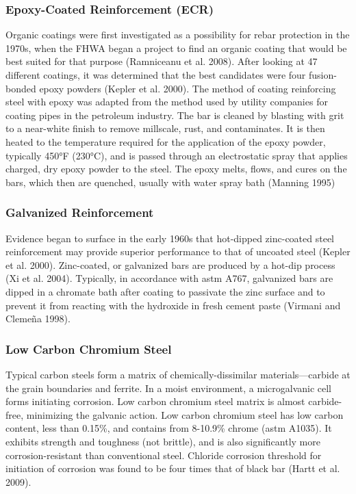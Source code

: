 \subsubsection{Epoxy-Coated Reinforcement (ECR)}

Organic coatings were first investigated as a possibility for rebar protection in the 1970s, when the FHWA began
a project to find an organic coating that would be best suited for that purpose (Ramniceanu et al. 2008). After
looking at 47 different coatings, it was determined that the best candidates were four fusion-bonded epoxy powders
(Kepler et al. 2000). The method of coating reinforcing steel with epoxy was adapted from the method used by
utility companies for coating pipes in the petroleum industry. The bar is cleaned by blasting with grit to a near-white
finish to remove millscale, rust, and contaminates. It is then heated to the temperature required for the application of
the epoxy powder, typically 450°F (230°C), and is passed through an electrostatic spray that applies charged, dry
epoxy powder to the steel. The epoxy melts, flows, and cures on the bars, which then are quenched, usually with
water spray bath (Manning 1995)


\subsubsection{Galvanized Reinforcement}
Evidence began to surface in the early 1960s that hot-dipped zinc-coated steel reinforcement may provide
superior performance to that of uncoated steel (Kepler et al. 2000). Zinc-coated, or galvanized bars are produced by
a hot-dip process (Xi et al. 2004). Typically, in accordance with \acrshort*{astm} A767, galvanized bars are dipped in a
chromate bath after coating to passivate the zinc surface and to prevent it from reacting with the hydroxide in fresh
cement paste (Virmani and Clemeña 1998).


\subsubsection{Low Carbon Chromium Steel}
Typical carbon steels form a matrix of chemically-dissimilar materials—carbide at the grain boundaries and
ferrite. In a moist environment, a microgalvanic cell forms initiating corrosion. Low carbon chromium steel matrix is
almost carbide-free, minimizing the galvanic action. Low carbon chromium steel has low carbon content, less than
0.15\%, and contains from 8-10.9\% chrome (\acrshort*{astm} A1035). It exhibits strength and toughness (not brittle), and is
also significantly more corrosion-resistant than conventional steel. Chloride corrosion threshold for initiation of
corrosion was found to be four times that of black bar (Hartt et al. 2009).

